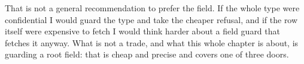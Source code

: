 %
That is not a general recommendation to prefer the field. If the whole type
were confidential I would guard the type and take the cheaper refusal, and if
the row itself were expensive to fetch I would think harder about a field
guard that fetches it anyway. What is not a trade, and what this whole
chapter is about, is guarding a root field: that is cheap and precise and
covers one of three doors.
%
